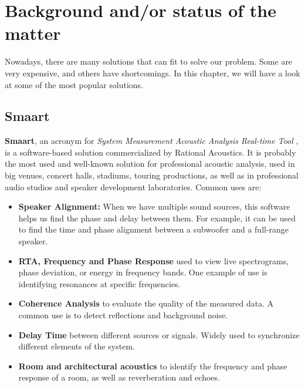 \chapter{Background and/or status of the matter}

Nowadays, there are many solutions that can fit to solve our problem. Some are very expensive, and others have shortcomings. In this chapter, we will have a look at some of the most popular solutions.

\section{Smaart}

\textbf{Smaart}, an acronym for \textit{System Measurement Acoustic Analysis Real-time Tool} \cite{SMAART}, is a software-based solution commercialized by Rational Acoustics. It is probably the most used and well-known solution for professional acoustic analysis, used in big venues, concert halls, stadiums, touring productions, as well as in professional audio studios and speaker development laboratories.  Common uses are:


\begin{itemize}
	\item \textbf{Speaker Alignment:} When we have multiple sound sources, this software helps us find the phase and delay between them. For example, it can be used to find the time and phase alignment between a subwoofer and a full-range speaker.
	
	\item \textbf{RTA, Frequency and Phase Response} used to view live spectrograms, phase deviation, or energy in frequency bands. One example of use is identifying resonances at specific frequencies.

	\item \textbf{Coherence Analysis} to evaluate the quality of the measured data. A common use is to detect reflections and background noise.
	
	\item \textbf{Delay Time} between different sources or signals. Widely used to synchronize different elements of the system.
	
	\item \textbf{Room and architectural acoustics} to identify the frequency and phase response of a room, as well as reverberation and echoes.
\end{itemize}
	
